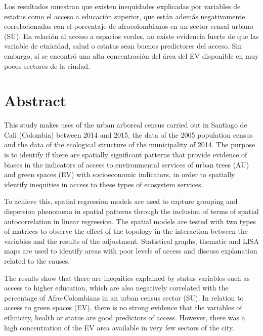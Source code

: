 \documentclass[12pt,a4paper,openany]{book}
\theoremstyle{definition}
\theoremstyle{definition}
\theoremstyle{definition}
\theoremstyle{remark}
\begin{document}
Los resultados muestran que existen inequidades explicadas por variables
de estatus como el acceso a educación superior, que están además
negativamente correlacionadas con el porcentaje de afrocolombianos en un
sector censal urbano (SU). En relación al acceso a espacios verdes, no
existe evidencia fuerte de que las variable de etnicidad, salud o
estatus sean buenos predictores del acceso. Sin embargo, sí se encontró
una alta concentración del área del EV disponible en muy pocos sectores
de la ciudad.

\chapter*{Abstract}\label{abstract}


This study makes uses of the urban arboreal census carried out in
Santiago de Cali (Colombia) between 2014 and 2015, the data of the 2005
population census and the data of the ecological structure of the
municipality of 2014. The purpose is to identify if there are spatially
significant patterns that provide evidence of biases in the indicators
of access to environmental services of urban trees (AU) and green spaces
(EV) with socioeconomic indicators, in order to spatially identify
inequities in access to these types of ecosystem services.

To achieve this, spatial regression models are used to capture grouping
and dispersion phenomena in spatial patterns through the inclusion of
terms of spatial autocorrelation in linear regression. The spatial
models are tested with two types of matrices to observe the effect of
the topology in the interaction between the variables and the results of
the adjustment. Statistical graphs, thematic and LISA maps are used to
identify areas with poor levels of access and discuss explanation
related to the causes.

The results show that there are inequities explained by status variables
such as access to higher education, which are also negatively correlated
with the percentage of Afro-Colombians in an urban census sector (SU).
In relation to access to green spaces (EV), there is no strong evidence
that the variables of ethnicity, health or status are good predictors of
access. However, there was a high concentration of the EV area available
in very few sectors of the city.


\setcounter{tocdepth}{2} \tableofcontents
\end{document}
